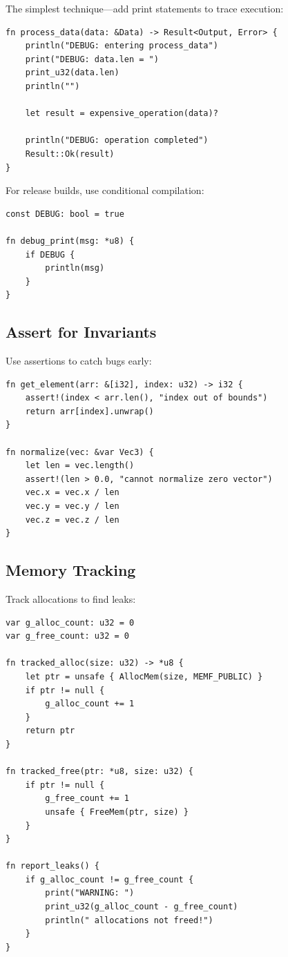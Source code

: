The simplest technique---add print statements to trace execution:

\begin{lstlisting}
fn process_data(data: &Data) -> Result<Output, Error> {
    println("DEBUG: entering process_data")
    print("DEBUG: data.len = ")
    print_u32(data.len)
    println("")

    let result = expensive_operation(data)?

    println("DEBUG: operation completed")
    Result::Ok(result)
}
\end{lstlisting}

For release builds, use conditional compilation:

\begin{lstlisting}
const DEBUG: bool = true

fn debug_print(msg: *u8) {
    if DEBUG {
        println(msg)
    }
}
\end{lstlisting}

\subsection{Assert for Invariants}

Use assertions to catch bugs early:

\begin{lstlisting}
fn get_element(arr: &[i32], index: u32) -> i32 {
    assert!(index < arr.len(), "index out of bounds")
    return arr[index].unwrap()
}

fn normalize(vec: &var Vec3) {
    let len = vec.length()
    assert!(len > 0.0, "cannot normalize zero vector")
    vec.x = vec.x / len
    vec.y = vec.y / len
    vec.z = vec.z / len
}
\end{lstlisting}

\subsection{Memory Tracking}

Track allocations to find leaks:

\begin{lstlisting}
var g_alloc_count: u32 = 0
var g_free_count: u32 = 0

fn tracked_alloc(size: u32) -> *u8 {
    let ptr = unsafe { AllocMem(size, MEMF_PUBLIC) }
    if ptr != null {
        g_alloc_count += 1
    }
    return ptr
}

fn tracked_free(ptr: *u8, size: u32) {
    if ptr != null {
        g_free_count += 1
        unsafe { FreeMem(ptr, size) }
    }
}

fn report_leaks() {
    if g_alloc_count != g_free_count {
        print("WARNING: ")
        print_u32(g_alloc_count - g_free_count)
        println(" allocations not freed!")
    }
}
\end{lstlisting}

